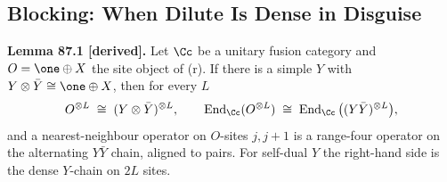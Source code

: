 
\subsection{Blocking: When Dilute Is Dense in Disguise}

\textbf{Lemma 87.1 [derived].}  Let \(\Cc\) be a unitary fusion category and
\(O=\one\oplus X\) the site object of (r).  If there is a simple \(Y\) with
\(Y\otimes\bar Y\cong\one\oplus X\), then for every \(L\)
\[
  O^{\otimes L}\;\cong\;(Y\otimes\bar Y)^{\otimes L},
  \qquad
  \operatorname{End}_{\Cc}(O^{\otimes L})\;\cong\;\operatorname{End}_{\Cc}\big((Y\bar Y)^{\otimes L}\big),
\]
and a nearest-neighbour operator on \(O\)-sites \(j,j+1\) is a range-four
operator on the alternating \(Y\bar Y\) chain, aligned to pairs.  For
self-dual \(Y\) the right-hand side is the dense \(Y\)-chain on \(2L\) sites.

